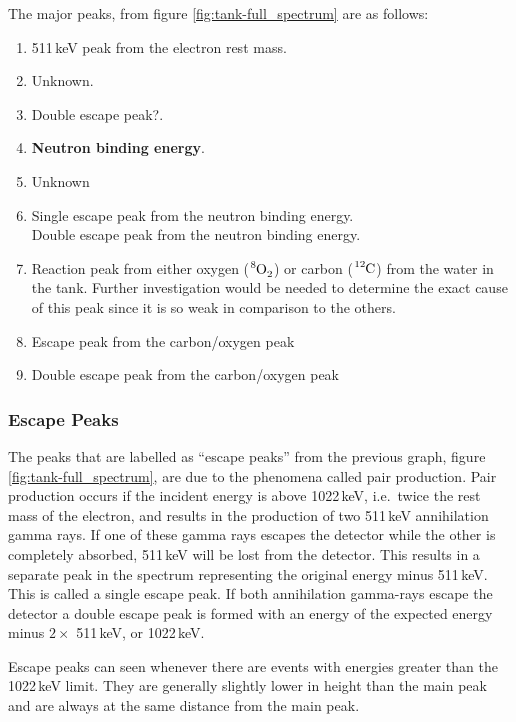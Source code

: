 The major peaks, from figure \ref{fig:tank-full_spectrum} are as follows:
	\begin{enumerate}\itemsep1pt \parskip0pt 
		\item 511\,keV peak from the electron rest mass.
		\item Unknown.
		\item Double escape peak?.
		\item \textbf{Neutron binding energy}.
		\item Unknown
		\item Single escape peak from the neutron binding energy.\\
		Double escape peak from the neutron binding energy.
		\item Reaction peak from either oxygen ($\ce{^8O_2}$) or carbon ($\ce{^{12}C}$) from the water in the tank. Further investigation would be needed to determine the exact cause of this peak since it is so weak in comparison to the others.
		\item Escape peak from the carbon/oxygen peak
		\item Double escape peak from the carbon/oxygen peak
	\end{enumerate}

\subsubsection{Escape Peaks} %
\label{ssub:escape_peaks}
The peaks that are labelled as ``escape peaks'' from the previous graph, figure \ref{fig:tank-full_spectrum}, are due to the phenomena called pair production. Pair production occurs if the incident energy is above 1022\,keV, i.e.\ twice the rest mass of the electron, and results in the production of two 511\,keV annihilation gamma rays. If one of these gamma rays escapes the detector while the other is completely absorbed, 511\,keV will be lost from the detector. This results in a separate peak in the spectrum representing the original energy minus 511\,keV. This is called a single escape peak. If both annihilation gamma-rays escape the detector a double escape peak is formed with an energy of the expected energy minus $2\times$ 511\,keV, or 1022\,keV.

Escape peaks can seen whenever there are events with energies greater than the 1022\,keV limit. They are generally slightly lower in height than the main peak and are always at the same distance from the main peak.

